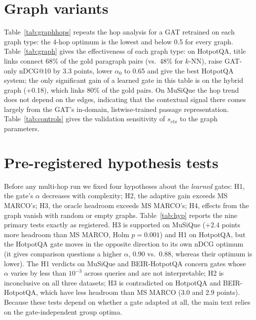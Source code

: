 \documentclass[11pt]{article}
\newcommand{\ctx}{s_{\mathit{ctx}}}
\begin{document}









\section{Graph variants}
\label{app:graph}



Table~\ref{tab:graphhops} repeats the hop analysis for a GAT retrained on each graph type: the 4-hop optimum is the
lowest and below 0.5 for every graph. Table~\ref{tab:graph} gives the effectiveness of each graph type: on HotpotQA,
title links connect 68\% of the gold paragraph pairs (vs.\ 48\% for $k$-NN), raise GAT-only nDCG@10 by 3.3 points,
lower $\alpha_0$ to 0.65 and give the best HotpotQA system; the only significant gain of a learned gate in this table is
on the hybrid graph (+0.18), which links 80\% of the gold pairs. On MuSiQue the hop trend does not depend on the edges,
indicating that the contextual signal there comes largely from the GAT's in-domain, listwise-trained passage
representation. Table~\ref{tab:controls} gives the validation sensitivity of $\ctx$ to the graph parameters.

\section{Pre-registered hypothesis tests}
\label{app:hyp}

Before any multi-hop run we fixed four hypotheses about the \emph{learned} gates: H1, the gate's $\alpha$ decreases
with complexity; H2, the adaptive gain exceeds MS MARCO's; H3, the oracle headroom exceeds MS MARCO's; H4, effects
from the graph vanish with random or empty graphs. Table~\ref{tab:hyp} reports the nine primary tests exactly as
registered. H3 is supported on MuSiQue (+2.4 points more headroom than MS MARCO, Holm $p=0.001$) and H1 on HotpotQA,
but the HotpotQA gate moves in the opposite direction to its own nDCG optimum (it gives comparison questions a higher
$\alpha$, 0.90 vs.\ 0.88, whereas their optimum is lower). The H1 verdicts on MuSiQue and BEIR-HotpotQA concern gates whose
$\alpha$ varies by less than $10^{-3}$ across queries and are not interpretable; H2 is inconclusive on all three
datasets; H3 is contradicted on HotpotQA and BEIR-HotpotQA, which have less headroom than MS MARCO (3.0 and 2.9 points).
Because these tests depend on whether a gate adapted at all, the main text relies on the gate-independent
group optima.
\end{document}
